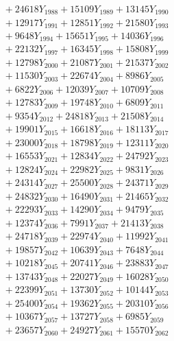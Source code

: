\documentclass[a4paper,10pt]{article}
\begin{document}
{\begin{align}
&\;  + 24618 Y_{1988} + 15109 Y_{1989} + 13145 Y_{1990} \\[0.3ex]
&\;  + 12917 Y_{1991} + 12851 Y_{1992} + 21580 Y_{1993} \\[0.3ex]
&\;  + 9648 Y_{1994} + 15651 Y_{1995} + 14036 Y_{1996} \\[0.3ex]
&\;  + 22132 Y_{1997} + 16345 Y_{1998} + 15808 Y_{1999} \\[0.3ex]
&\;  + 12798 Y_{2000} + 21087 Y_{2001} + 21537 Y_{2002} \\[0.3ex]
&\;  + 11530 Y_{2003} + 22674 Y_{2004} + 8986 Y_{2005} \\[0.3ex]
&\;  + 6822 Y_{2006} + 12039 Y_{2007} + 10709 Y_{2008} \\[0.5ex]\allowbreak
&\;  + 12783 Y_{2009} + 19748 Y_{2010} + 6809 Y_{2011} \\[0.3ex]
&\;  + 9354 Y_{2012} + 24818 Y_{2013} + 21508 Y_{2014} \\[0.3ex]
&\;  + 19901 Y_{2015} + 16618 Y_{2016} + 18113 Y_{2017} \\[0.3ex]
&\;  + 23000 Y_{2018} + 18798 Y_{2019} + 12311 Y_{2020} \\[0.3ex]
&\;  + 16553 Y_{2021} + 12834 Y_{2022} + 24792 Y_{2023} \\[0.3ex]
&\;  + 12824 Y_{2024} + 22982 Y_{2025} + 9831 Y_{2026} \\[0.3ex]
&\;  + 24314 Y_{2027} + 25500 Y_{2028} + 24371 Y_{2029} \\[0.3ex]
&\;  + 24832 Y_{2030} + 16490 Y_{2031} + 21465 Y_{2032} \\[0.3ex]
&\;  + 22293 Y_{2033} + 14290 Y_{2034} + 9479 Y_{2035} \\[0.3ex]
&\;  + 12374 Y_{2036} + 7991 Y_{2037} + 21413 Y_{2038} \\[0.5ex]\allowbreak
&\;  + 24718 Y_{2039} + 22974 Y_{2040} + 11992 Y_{2041} \\[0.3ex]
&\;  + 19857 Y_{2042} + 10639 Y_{2043} + 7648 Y_{2044} \\[0.3ex]
&\;  + 10218 Y_{2045} + 20741 Y_{2046} + 23883 Y_{2047} \\[0.3ex]
&\;  + 13743 Y_{2048} + 22027 Y_{2049} + 16028 Y_{2050} \\[0.3ex]
&\;  + 22399 Y_{2051} + 13730 Y_{2052} + 10144 Y_{2053} \\[0.3ex]
&\;  + 25400 Y_{2054} + 19362 Y_{2055} + 20310 Y_{2056} \\[0.3ex]
&\;  + 10367 Y_{2057} + 13727 Y_{2058} + 6985 Y_{2059} \\[0.3ex]
&\;  + 23657 Y_{2060} + 24927 Y_{2061} + 15570 Y_{2062} \\[0.3ex]

\end{align}}
\end{document}

